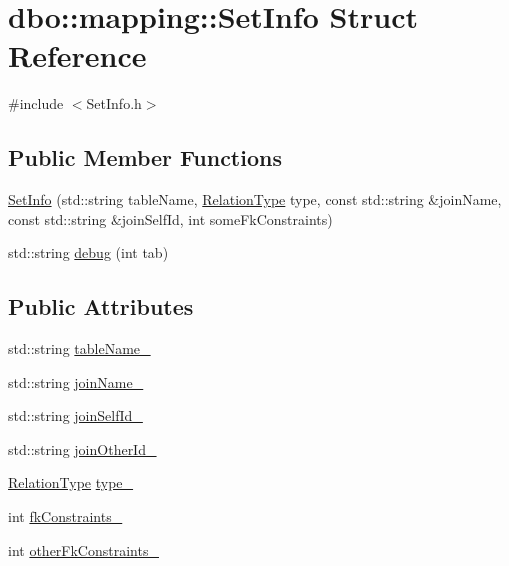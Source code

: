 \hypertarget{structdbo_1_1mapping_1_1_set_info}{\section{dbo\+:\+:mapping\+:\+:Set\+Info Struct Reference}
\label{structdbo_1_1mapping_1_1_set_info}
}


{\ttfamily \#include $<$Set\+Info.\+h$>$}

\subsection*{Public Member Functions}
\begin{DoxyCompactItemize}
\item 
\hyperlink{structdbo_1_1mapping_1_1_set_info_a089ee965269d4a8538f82e11540ad26f}{Set\+Info} (std\+::string table\+Name, \hyperlink{namespacedbo_ab7f92e64aea13b1e3b60021e72a9fc73}{Relation\+Type} type, const std\+::string \&join\+Name, const std\+::string \&join\+Self\+Id, int some\+Fk\+Constraints)
\item 
std\+::string \hyperlink{structdbo_1_1mapping_1_1_set_info_adb66cca5ff652c1bc5cea8f25d0142b2}{debug} (int tab)
\end{DoxyCompactItemize}
\subsection*{Public Attributes}
\begin{DoxyCompactItemize}
\item 
std\+::string \hyperlink{structdbo_1_1mapping_1_1_set_info_a15381af2c3f8d8341b006633df78eade}{table\+Name\+\_\+}
\item 
std\+::string \hyperlink{structdbo_1_1mapping_1_1_set_info_ae400d74bc9aee243a56ade82510a0d8e}{join\+Name\+\_\+}
\item 
std\+::string \hyperlink{structdbo_1_1mapping_1_1_set_info_acce28d7bd0a498487f56801eab1dfb86}{join\+Self\+Id\+\_\+}
\item 
std\+::string \hyperlink{structdbo_1_1mapping_1_1_set_info_a590227560e9e15aeca0f0f6215c64f25}{join\+Other\+Id\+\_\+}
\item 
\hyperlink{namespacedbo_ab7f92e64aea13b1e3b60021e72a9fc73}{Relation\+Type} \hyperlink{structdbo_1_1mapping_1_1_set_info_a8e23d703a1fe265a10f4cdb335cb488e}{type\+\_\+}
\item 
int \hyperlink{structdbo_1_1mapping_1_1_set_info_a8ee87d40f0f835482282c804c309c968}{fk\+Constraints\+\_\+}
\item 
int \hyperlink{structdbo_1_1mapping_1_1_set_info_a05c008084f20eb52f7f1145be419d2f1}{other\+Fk\+Constraints\+\_\+}
\end{DoxyCompactItemize}


